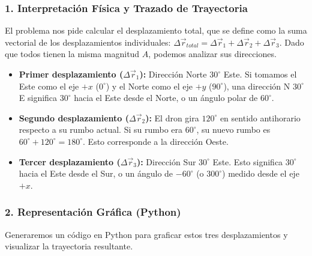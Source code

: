 \documentclass[12pt, a4paper]{article}
\begin{document}
\subsubsection*{1. Interpretación Física y Trazado de Trayectoria}
El problema nos pide calcular el desplazamiento total, que se define como la suma vectorial de los desplazamientos individuales: $\Delta\vec{r}_{total} = \Delta\vec{r}_1 + \Delta\vec{r}_2 + \Delta\vec{r}_3$. Dado que todos tienen la misma magnitud $A$, podemos analizar sus direcciones.

\begin{itemize}
    \item \textbf{Primer desplazamiento ($\Delta\vec{r}_1$):} Dirección Norte $30^\circ$ Este. Si tomamos el Este como el eje $+x$ ($0^\circ$) y el Norte como el eje $+y$ ($90^\circ$), una dirección N $30^\circ$ E significa $30^\circ$ hacia el Este desde el Norte, o un ángulo polar de $60^\circ$.
    \item \textbf{Segundo desplazamiento ($\Delta\vec{r}_2$):} El dron gira $120^\circ$ en sentido antihorario respecto a su rumbo actual. Si su rumbo era $60^\circ$, su nuevo rumbo es $60^\circ + 120^\circ = 180^\circ$. Esto corresponde a la dirección Oeste.
    \item \textbf{Tercer desplazamiento ($\Delta\vec{r}_3$):} Dirección Sur $30^\circ$ Este. Esto significa $30^\circ$ hacia el Este desde el Sur, o un ángulo de $-60^\circ$ (o $300^\circ$) medido desde el eje $+x$.
\end{itemize}

\subsubsection*{2. Representación Gráfica (Python)}
Generaremos un código en Python para graficar estos tres desplazamientos y visualizar la trayectoria resultante.
\end{document}
